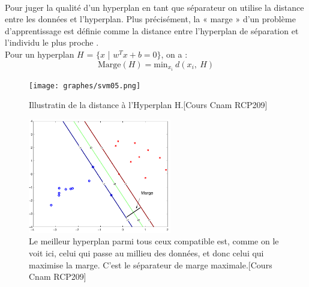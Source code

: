 \documentclass[a4paper,12pt,titlepage]{report}
\begin{document}
\paragraph{}
Pour juger la qualité d’un hyperplan en tant que séparateur on utilise la distance entre les données et l'hyperplan. Plus précisément, la « marge » d’un problème d'apprentissage est définie comme la distance entre l’hyperplan de séparation et l'individu le plus proche . \\
Pour un hyperplan $H$ = $\{x$ | $w^T x + b =0\}$, on a :
\[
\text{Marge}(H) = \text{min}_{x_{i}}\ d(x_i,\ H)
\]
\begin{figure}[!h]
	\begin{center}
	\centering	
		\texttt{[image: graphes/svm05.png]}
		\caption{Illustratin de la distance à l'Hyperplan H.[Cours Cnam RCP209] }
	\end{center}
\end{figure}
\begin{figure}[!h]
	\begin{center}
	\centering	
		\includegraphics[height =5cm, keepaspectratio]{graphes/svm04.png}
		\caption{Le meilleur hyperplan parmi tous ceux compatible est, comme on le voit ici, celui qui passe au \og millieu \fg des données, et donc celui qui maximise la marge. C’est le séparateur de marge maximale.[Cours Cnam RCP209]}
	\end{center}
\end{figure}
\end{document}
